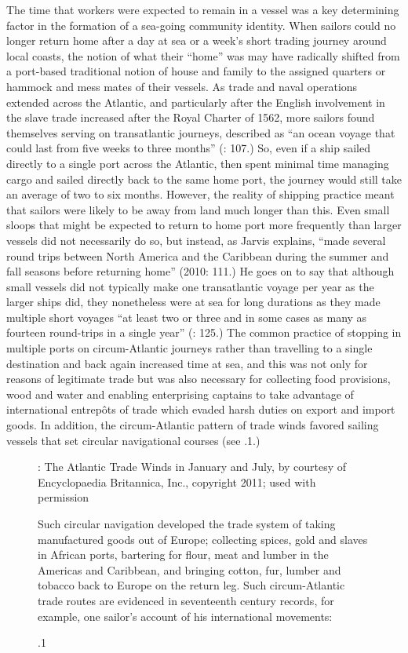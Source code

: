 The time that workers were expected to remain in a vessel was a key determining factor in the formation of a sea-going community identity. When sailors could no longer return home after a day at sea or a week’s short trading journey around local coasts, the notion of what their “home” was may have radically shifted from a port-based traditional notion of house and family to the assigned quarters or hammock and mess mates of their vessels. As trade and naval operations extended across the Atlantic, and particularly after the English involvement in the slave trade increased after the Royal Charter of 1562, more sailors found themselves serving on transatlantic journeys, described as “an ocean voyage that could last from five weeks to three months” (\citealt{Brown2011}: 107.) So, even if a ship sailed directly to a single port across the Atlantic, then spent minimal time managing cargo and sailed directly back to the same home port, the journey would still take an average of two to six months. However, the reality of shipping practice meant that sailors were likely to be away from land much longer than this. Even small sloops that might be expected to return to home port more frequently than larger vessels did not necessarily do so, but instead, as Jarvis explains, “made several round trips between North America and the Caribbean during the summer and fall seasons before returning home” (2010: 111.)  He goes on to say that although small vessels did not typically make one transatlantic voyage per year as the larger ships did, they nonetheless were at sea for long durations as they made multiple short voyages “at least two or three and in some cases as many as fourteen round-trips in a single year” (\citealt{Jarvis2010}: 125.) The common practice of stopping in multiple ports on circum-Atlantic journeys rather than travelling to a single destination and back again increased time at sea, and this was not only for reasons of legitimate trade but was also necessary for collecting food provisions, wood and water and enabling enterprising captains to take advantage of international entrepôts of trade which evaded harsh duties on export and import goods. In addition, the circum-Atlantic pattern of trade winds favored sailing vessels that set circular navigational courses (see .1.) 


\begin{figure}
\caption{\label{fig:key:4}.1}: The Atlantic Trade Winds in January and July, by courtesy of Encyclopaedia Britannica, Inc., copyright 2011; used with permission

Such circular navigation developed the trade system of taking manufactured goods out of Europe; collecting spices, gold and slaves in African ports, bartering for flour, meat and lumber in the Americas and Caribbean, and bringing cotton, fur, lumber and tobacco back to Europe on the return leg. Such circum-Atlantic trade routes are evidenced in seventeenth century records, for example, one sailor’s account of his international movements:

 
\end{figure}



